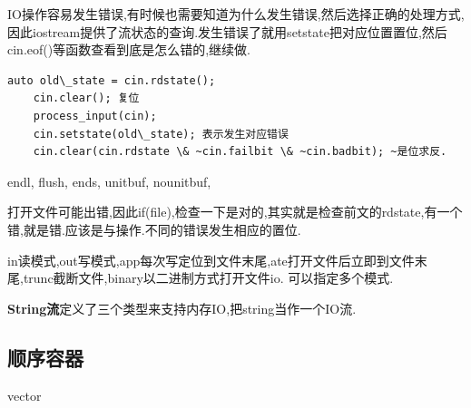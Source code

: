 IO操作容易发生错误,有时候也需要知道为什么发生错误,然后选择正确的处理方式,因此iostream提供了流状态的查询.发生错误了就用setstate把对应位置置位,然后cin.eof()等函数查看到底是怎么错的,继续做.
\begin{lstlisting}[caption={}]
	auto old\_state = cin.rdstate();
	cin.clear(); 复位
	process_input(cin);
	cin.setstate(old\_state); 表示发生对应错误
	cin.clear(cin.rdstate \& ~cin.failbit \& ~cin.badbit); ~是位求反.
\end{lstlisting}

endl, flush, ends, unitbuf, nounitbuf,

打开文件可能出错,因此if(file),检查一下是对的,其实就是检查前文的rdstate,有一个错,就是错.应该是与操作.不同的错误发生相应的置位.

in读模式,out写模式,app每次写定位到文件末尾,ate打开文件后立即到文件末尾,trunc截断文件,binary以二进制方式打开文件io. 可以指定多个模式.

\textbf{String流}定义了三个类型来支持内存IO,把string当作一个IO流.

\subsection{顺序容器}

vector

